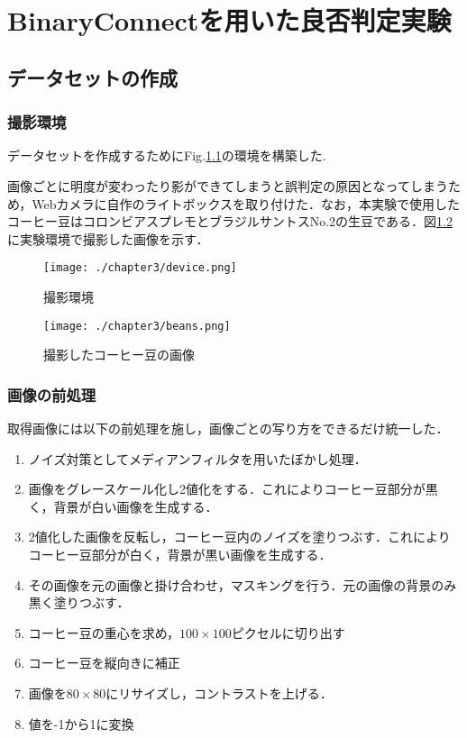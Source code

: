 
\chapter{BinaryConnectを用いた良否判定実験}

\section{データセットの作成}
\subsection{撮影環境}
データセットを作成するためにFig.\ref{fig_camera}の環境を構築した.

画像ごとに明度が変わったり影ができてしまうと誤判定の原因となってしまうため，Webカメラに自作のライトボックスを取り付けた．なお，本実験で使用したコーヒー豆はコロンビアスプレモとブラジルサントスNo.2の生豆である．図\ref{fig_beans}に実験環境で撮影した画像を示す．
\begin{figure}[htbp]
  \begin{center}
    \texttt{[image: ./chapter3/device.png]}
    \caption{撮影環境}
    \label{fig_camera}
  \end{center}
\end{figure}
\begin{figure}[htbp]
  \begin{center}
    \texttt{[image: ./chapter3/beans.png]}
    \caption{撮影したコーヒー豆の画像}
    \label{fig_beans}
  \end{center}
\end{figure}

\subsection{画像の前処理}
取得画像には以下の前処理を施し，画像ごとの写り方をできるだけ統一した．
\begin{enumerate}
  \item ノイズ対策としてメディアンフィルタを用いたぼかし処理．
  \item 画像をグレースケール化し2値化をする．これによりコーヒー豆部分が黒く，背景が白い画像を生成する．
  \item 2値化した画像を反転し，コーヒー豆内のノイズを塗りつぶす．これによりコーヒー豆部分が白く，背景が黒い画像を生成する．
  \item その画像を元の画像と掛け合わせ，マスキングを行う．元の画像の背景のみ黒く塗りつぶす．
  \item コーヒー豆の重心を求め，$100\times 100$ピクセルに切り出す
  \item コーヒー豆を縦向きに補正
  \item 画像を$80\times 80$にリサイズし，コントラストを上げる．
  \item 値を-1から1に変換
\end{enumerate}

